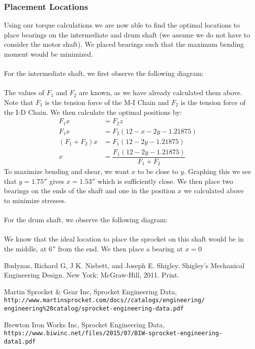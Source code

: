 \documentclass[letterpaper,12pt]{article}
\begin{document}
\subsubsection{Placement Locations}
Using our torque calculations we are now able to find the optimal locations to place bearings on the intermediate and drum shaft (we assume we do not have to consider the motor shaft). We placed bearings such that the maximum bending moment would be minimized.\\\\
For the intermediate shaft, we first observe the following diagram:\\\\
The values of $F_1$ and $F_2$ are known, as we have already calculated them above. Note that $F_1$ is the tension force of the M-I Chain and $F_2$ is the tension force of the I-D Chain. We then calculate the optimal positions by:
\begin{align*}
    F_1x &= F_2z \\
    F_1x &= F_2(12-x-2y-1.21875) \\
    (F_1 + F_2)x &= F_1(12-2y-1.21875) \\
    x &= \dfrac{F_1(12-2y-1.21875)}{F_1 + F_2}
\end{align*}
To maximize bending and shear, we want $x$ to be close to $y$. Graphing this we see that $y=1.75''$ gives $x=1.53''$ which is sufficiently close. We then place two bearings on the ends of the shaft and one in the position $x$ we calculated above to minimize stresses. \\\\
For the drum shaft, we observe the following diagram: \\\\
We know that the ideal location to place the sprocket on this shaft would be in the middle, at $6''$ from the end. We then place a bearing at $x=0$

\begin{thebibliography}{9}
Budynas, Richard G, J K. Nisbett, and Joseph E. Shigley. Shigley's Mechanical Engineering Design. New York: McGraw-Hill, 2011. Print. 

Martin Sprocket \& Gear Inc, Sprocket Engineering Data,
\\\texttt{http://www.martinsprocket.com/docs//catalogs/engineering/\\engineering\%20catalog/sprocket-engineering-data.pdf}
 
Brewton Iron Works Inc, Sprocket Engineering Data,
\\\texttt{https://www.biwinc.net/files/2015/07/BIW-sprocket-engineering-data1.pdf}
\end{thebibliography}
\end{document}
